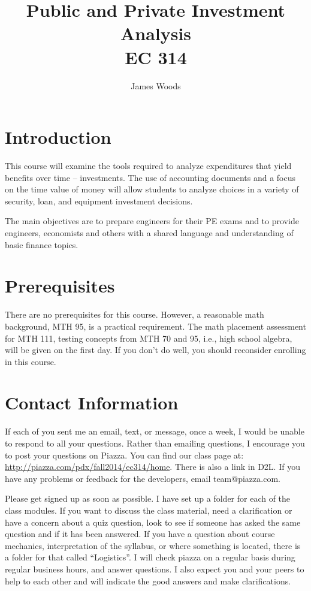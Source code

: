 \documentclass[letterpaper,10pt]{article}
\date{}
\title{Public and Private Investment Analysis\\ 
EC 314\\
\Term}
\author{James Woods}
\newcommand{\Piazza}{\url{http://piazza.com/pdx/fall2014/ec314/home}}
\begin{document}
  
\maketitle

\section{Introduction}

This course will examine the tools required to analyze expenditures
that yield benefits over time -- investments. The use of accounting
documents and a focus on the time value of money will allow students
to analyze choices in a variety of security, loan, and equipment
investment decisions.

The main objectives are to prepare engineers for their PE exams and to
provide engineers, economists and others with a shared language and
understanding of basic finance topics.




\section{Prerequisites}

There are no prerequisites for this course. However, a reasonable math
background, MTH 95, is a practical requirement. The math placement assessment for MTH 111, testing concepts from MTH 70 and 95, i.e., high school algebra, will be given on the first day.  If you don't do well, you
should reconsider enrolling in this course.

\section{Contact Information}

If each of you sent me an email, text, or message, once a week, I would be unable to respond to all your questions.  Rather than emailing questions, I encourage you to post your questions on Piazza. You can find our class page at: \Piazza.  There is also a link in D2L. If you have any problems or feedback for the developers, email team@piazza.com.



Please get signed up as soon as possible. I have set up a
folder for each of the class modules. If you want to discuss the class material, need a clarification or have a concern about a quiz question, look to see if someone has asked the same question and if it has been answered. 
If you have a question about course mechanics, interpretation of the
syllabus, or where something is located, there is a folder for
that called ``Logistics''. I will check piazza on a regular basis during regular business hours, and answer questions. I also expect you and your peers to help to each other and will indicate the good answers and make clarifications.  
\end{document}
